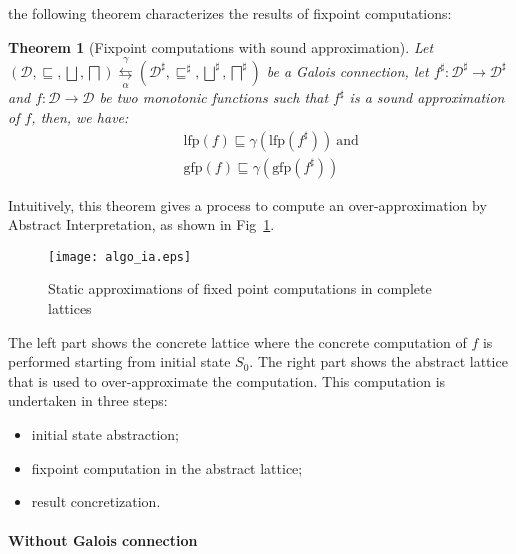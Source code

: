 \documentclass[submission,copyright,creativecommons]{eptcs}
\newtheorem{theorem}{Theorem}
\newcommand{\sh}[1]{\ensuremath{#1^\sharp}}
\newcommand{\lfp}{\ensuremath{\textrm{lfp}}}
\newcommand{\gfp}{\ensuremath{\textrm{gfp}}}
\begin{document}
the following theorem characterizes the results of fixpoint computations:
\begin{theorem}[Fixpoint computations with sound approximation]
  Let $(\mathcal{D}, \sqsubseteq,\bigsqcup, \bigsqcap)
  \overset{\gamma}{\underset{\alpha}{\leftrightarrows}}
  (\mathcal{D}^\sharp, \sqsubseteq^\sharp, \bigsqcup^\sharp, \sh{\bigsqcap}) $ be
a Galois connection, let $\sh{f}:
  \sh{\mathcal{D}} \rightarrow \sh{\mathcal{D}}$ and $f: \mathcal{D}\rightarrow \mathcal{D}$ 
be two monotonic functions such that $\sh{f}$ is a sound approximation of $f$, 
then, we have:
\begin{eqnarray*}
&&\lfp(f) \sqsubseteq \gamma(\lfp(\sh{f}))~\textrm{and} \\
&&\gfp(f) \sqsubseteq \gamma(\gfp(\sh{f}))
\end{eqnarray*}
\end{theorem}
\noindent
Intuitively, this theorem gives a process to compute an over-approximation by
Abstract Interpretation, as shown in Fig~\ref{fig:algo_ia}.
\begin{figure}
\begin{center}
  \texttt{[image: algo\_ia.eps]}
\end{center}
\caption{Static approximations of fixed point computations in complete lattices}
\label{fig:algo_ia}
\end{figure}
The left part shows the concrete lattice where the concrete computation of $f$
is performed starting from initial state $S_0$. The right part shows the
abstract lattice that is used to over-approximate the computation.
This computation is undertaken in three steps:
\begin{itemize}
\item initial state abstraction;
\item fixpoint computation in the abstract lattice;
\item result concretization.
\end{itemize}
 

\paragraph{Without Galois connection}
\end{document}
